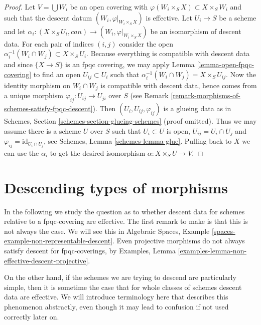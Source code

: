 \begin{proof}
Let $V = \bigcup W_i$ be an open covering with
$\varphi(W_i \times_S X) \subset X \times_S W_i$
and such that the descent datum $(W_i, \varphi|_{W_i \times_S X})$
is effective. Let $U_i \to S$ be a scheme and let
$\alpha_i : (X \times_S U_i, can) \to (W_i, \varphi|_{W_i \times_S X})$
be an isomorphism of descent data. For each pair of indices
$(i, j)$ consider the open
$\alpha_i^{-1}(W_i \cap W_j) \subset X \times_S U_i$.
Because everything is compatible with descent data
and since $\{X \to S\}$ is an fpqc covering, we
may apply Lemma \ref{lemma-open-fpqc-covering}
to find an open $U_{ij} \subset U_i$ such that
$\alpha_i^{-1}(W_i \cap W_j) = X \times_S U_{ij}$.
Now the identity morphism on $W_i \cap W_j$ is
compatible with descent data, hence comes from a
unique morphism $\varphi_{ij} : U_{ij} \to U_{ji}$ over $S$
(see Remark \ref{remark-morphisms-of-schemes-satisfy-fpqc-descent}).
Then $(U_i, U_{ij}, \varphi_{ij})$ is a glueing
data as in Schemes, Section \ref{schemes-section-glueing-schemes}
(proof omitted). Thus we may assume there is a scheme $U$ over $S$
such that $U_i \subset U$ is open, $U_{ij} = U_i \cap U_j$ and
$\varphi_{ij} = \text{id}_{U_i \cap U_j}$, see
Schemes, Lemma \ref{schemes-lemma-glue}.
Pulling back to $X$ we can use the $\alpha_i$ to
get the desired isomorphism $\alpha : X \times_S U \to V$.
\end{proof}







\section{Descending types of morphisms}
\label{section-descending-types-morphisms}

\noindent
In the following we study the question as to whether
descent data for schemes relative to a fpqc-covering
are effective. The first remark to make is that this
is not always the case. We will see this in Algebraic
Spaces, Example \ref{spaces-example-non-representable-descent}.
Even projective morphisms do not always satisfy descent
for fpqc-coverings, by Examples,
Lemma \ref{examples-lemma-non-effective-descent-projective}.

\medskip\noindent
On the other hand, if the schemes we are trying to
descend are particularly simple, then it is sometime the
case that for whole classes of schemes descent data
are effective. We will introduce terminology here that
describes this phenomenon abstractly, even though it
may lead to confusion if not used correctly later on.


